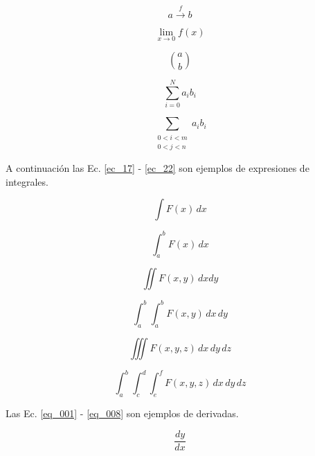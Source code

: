 \documentclass{article}
\begin{document}
\begin{equation} \label{ec_13}
    \displaystyle{a \stackrel{f} {\rightarrow} b}
\end{equation}

\begin{equation} \label{ec_14}
    \displaystyle{\lim_{x \rightarrow 0}} f(x)
\end{equation}

\begin{equation} \label{ec_15}
    \displaystyle{a \choose b}
\end{equation}

\begin{equation} \label{ec_16}
    \displaystyle{\sum_{i = 0}^{N} a_i b_i}
\end{equation}

\begin{equation} \label{ec_16}
    \displaystyle{\sum_{\substack{0 < i < m \\ 0 < j < n}} a_i b_i}
\end{equation}

A continuación las Ec. \eqref{ec_17} - \eqref{ec_22} son ejemplos de expresiones de integrales.

\begin{equation} \label{ec_17}
    \int F(x) \, dx
\end{equation}

\begin{equation} \label{ec_18}
    \int_{a}^{b} F(x) \, dx
\end{equation}

\begin{equation} \label{ec_19}
    \iint F(x,y) \, dx dy
\end{equation}

\begin{equation} \label{ec_20}
    \int_{a}^{b} \int_{a}^{b} F(x,y) \, dx \, dy
\end{equation}

\begin{equation} \label{ec_21}
    \iiint F(x,y,z) \, dx \, dy \, dz
\end{equation}

\begin{equation} \label{ec_22}
    \int_{a}^{b} \int_{c}^{d} \int_{e}^{f} F(x,y,z) \, dx \, dy \, dz
\end{equation}

Las Ec. \eqref{eq_001} - \eqref{eq_008} son ejemplos de derivadas.

\begin{equation} \label{eq_001}
    \frac{dy}{dx}
\end{equation}
\end{document}
